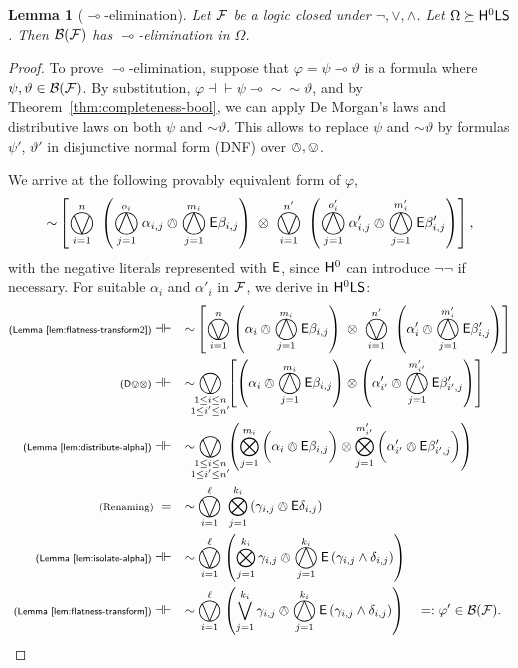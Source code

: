 \documentclass[a4paper,english,fleqn,11pt,final]{scrartcl}
\newcommand{\logicOpFont}[1]{\mathsf{#1}}
\newcommand{\negg}{{\sim}}
\newcommand{\E}{\protect\ensuremath\logicOpFont{E}}
\newcommand{\calB}{\protect\ensuremath{\mathcal{B}}}
\newcommand{\calF}{\protect\ensuremath{\mathcal{F}}}
\newcommand{\sfS}{\protect\ensuremath{\mathsf{S}}}
\newcommand{\sfH}{\protect\ensuremath{\mathsf{H}}}
\newcommand{\sfL}{\protect\ensuremath{\mathsf{L}}}
\newcommand{\limp}{\multimap}
\newcommand{\eqpr}{\dashv\vdash}
\newcommand{\tens}{\otimes}
\newcommand{\Apply}[1]{\textsf{\scriptsize{}#1}}
\newcommand{\oland}{\owedge}
\DeclareMathOperator*{\bigovee}{\scalerel*{\ovee}{\sum}}
\DeclareMathOperator*{\bigoland}{\scalerel*{\owedge}{\sum}}
\DeclareMathOperator*{\bigtens}{\bigotimes}
\theoremstyle{plain}
\newtheorem{lemma}[theorem]{Lemma}
\theoremstyle{definition}
\begin{document}
\begin{lemma}[$\limp$-elimination]\label{lem:tensor-elim}
Let $\calF$ be a logic closed under $\neg, \lor, \land$.
Let $\Omega\succeq \sfH^0\sfL\sfS$.
Then $\calB(\calF)$ has $\limp$-elimination in $\Omega$.
\end{lemma}
\begin{proof}
To prove $\limp$-elimination, suppose that $\varphi = \psi \limp \vartheta$ is a formula where $\psi,\vartheta \in \calB(\calF)$.
By substitution, $\varphi \eqpr \psi \limp \negg \negg \vartheta$, and by Theorem~\ref{thm:completeness-bool}, we can apply De Morgan's laws and distributive laws on both $\psi$ and $\negg\vartheta$.
This allows to replace $\psi$ and $\negg\vartheta$ by formulas $\psi'$, $\vartheta'$ in disjunctive normal form (DNF) over $\oland,\ovee$.

We arrive at the following provably equivalent form of $\varphi$,
\[
\negg\left[\bigovee_{i=1}^n\; \left(\bigoland_{j=1}^{o_i}\alpha_{i,j} \oland \bigoland_{j=1}^{m_i} \E\beta_{i,j} \right) \;\tens \;\bigovee_{i=1}^{n'}\; \left( \bigoland_{j=1}^{o'_i}\alpha'_{i,j} \oland \bigoland_{j=1}^{m'_i} \E\beta'_{i,j} \right)\right]\text{,}
\]
with the negative literals represented with $\E$, since $\sfH^0$ can introduce $\neg\neg$ if necessary.
For suitable $\alpha_i$ and $\alpha'_i$ in $\calF$, we derive in $\sfH^0\sfL\sfS$:
	\begin{align*}
	\Apply{(Lemma~\ref{lem:flatness-transform2})}\eqpr \quad &\negg\left[\bigovee_{i=1}^n \left(\alpha_i \oland \bigoland_{j=1}^{m_i} \E\beta_{i,j} \right) \;\tens \;\bigovee_{i=1}^{n'}\; \left(\alpha'_i \oland \bigoland_{j=1}^{m'_i} \E\beta'_{i,j} \right)\right]\\
	\Apply{(D$\ovee\tens$)}\eqpr \quad &\negg\!\!\!\bigovee_{\substack{1 \leq i \leq n\\1\leq i' \leq n'}}\!\! \left[ \left( \alpha_{i} \oland \bigoland_{j=1}^{m_i} \E \beta_{i,j} \right) \tens \left( \alpha'_{i'} \oland \bigoland_{j=1}^{m'_{i'}} \E \beta'_{i',j} \right) \right]\\
	\Apply{(Lemma~\ref{lem:distribute-alpha})}\eqpr \quad &\negg\!\!\!\bigovee_{\substack{1 \leq i \leq n\\1\leq i' \leq n'}} \!\! \left( \bigtens_{j=1}^{m_i} \bigg( \alpha_{i} \oland \E \beta_{i,j} \bigg) \tens \bigtens_{j=1}^{m'_{i'}} \bigg( \alpha'_{i'} \oland \E \beta'_{i',j} \bigg)\right)\\
	\text{\scriptsize(Renaming)}\; = \quad &\negg \bigovee_{i = 1}^{\ell}\;  \bigtens_{j=1}^{k_i} \left(\gamma_{i,j} \oland \E \delta_{i,j} \right)\\
		\Apply{(Lemma~\ref{lem:isolate-alpha})}\eqpr \quad &\negg \bigovee_{i = 1}^{\ell}  \left(\bigtens_{j=1}^{k_i} \gamma_{i,j} \oland \bigoland_{j=1}^{k_i} \E \left(\gamma_{i,j} \land \delta_{i,j} \right)\right)\\
		\Apply{(Lemma~\ref{lem:flatness-transform})}\eqpr \quad &\negg \bigovee_{i = 1}^{\ell} \left(\bigvee_{j=1}^{k_i} \gamma_{i,j} \oland \bigoland_{j=1}^{k_i} \E \left(\gamma_{i,j} \land \delta_{i,j} \right)\right) \quad =: \varphi' \in \calB(\calF)\text{.}
	\end{align*}
\end{proof}
\end{document}
